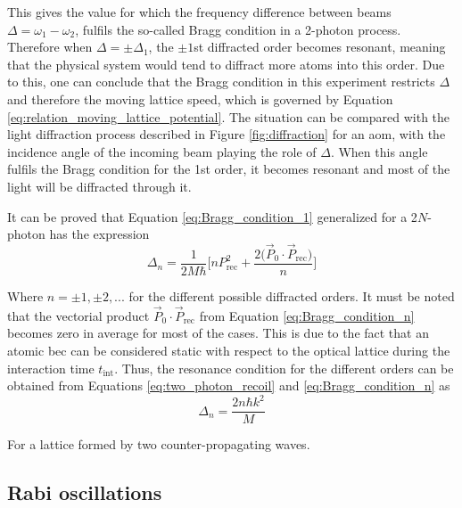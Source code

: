 This gives the value for which the frequency difference between beams $\Delta = \omega_1-\omega_2$, fulfils the so-called Bragg condition in a 2-photon process. Therefore when $\Delta = \pm\Delta_1$, the $\pm1$st diffracted order becomes resonant, meaning that the physical system would tend to diffract more atoms into this order. Due to this, one can conclude that the Bragg condition in this experiment restricts $\Delta$ and therefore the moving lattice speed, which is governed by Equation \eqref{eq:relation_moving_lattice_potential}. The situation can be compared with the light diffraction process described in Figure \ref{fig:diffraction} for an \ac{aom}, with the incidence angle of the incoming beam playing the role of $\Delta$. When this angle fulfils the Bragg condition for the 1st order, it becomes resonant and most of the light will be diffracted through it. 

It can be proved that Equation \eqref{eq:Bragg_condition_1} generalized for a 2$N$-photon has the expression \cite{Kozuma1999}
\begin{equation}\label{eq:Bragg_condition_n}
	\Delta_n = \frac{1}{2M\hbar} \Bigg[n P_{\text{rec}}^2 + \frac{2\big(\vec{P}_0 \cdot \vec{P}_{\text{rec}}\big)}{n}\Bigg]
\end{equation}

Where $n=\pm1, \pm2, \text{...}$ for the different possible diffracted orders. It must be noted that the vectorial product $\vec{P}_0 \cdot \vec{P}_{\text{rec}}$ from Equation \eqref{eq:Bragg_condition_n} becomes zero in average for most of the cases. This is due to the fact that an atomic \ac{bec} can be considered static with respect to the optical lattice during the interaction time $t_{\text{int}}$. Thus, the resonance condition for the different orders can be obtained from Equations \eqref{eq:two_photon_recoil} and \eqref{eq:Bragg_condition_n} as
\begin{equation}\label{eq:Bragg_condition}
	\Delta_n = \frac{2n\hbar k^2}{M}
\end{equation}

For a lattice formed by two counter-propagating waves.

\subsection{Rabi oscillations}\label{subsec:Rabi_oscillations}

